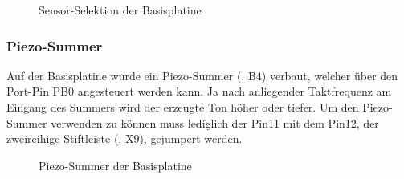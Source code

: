 \begin{figure}[htb]
    \centering
    \qquad
    \qquad
    \caption[Sensor-Selektion der Basisplatine]{Sensor-Selektion der \gls{Basisplatine}}
    \label{fig:basisplatine-ssel2}
\end{figure}

\subsubsection{Piezo-Summer}
Auf der \gls{Basisplatine} wurde ein Piezo-Summer (, B4) verbaut, welcher über den Port-Pin PB0 angesteuert werden kann. Ja nach anliegender Taktfrequenz am Eingang des Summers wird der erzeugte Ton höher oder tiefer. Um den Piezo-Summer verwenden zu können muss lediglich der Pin11 mit dem Pin12, der zweireihige Stiftleiste (, X9), gejumpert werden.

\begin{figure}[htb]
    \centering
    \qquad
    \qquad
    \caption[Piezo-Summer der Basisplatine]{Piezo-Summer der \gls{Basisplatine}}
    \label{fig:basisplatine-piezo}
\end{figure}

